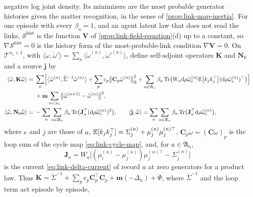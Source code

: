negative log joint density. Its minimizers are the most
probable generator histories given the matter recognition, in the sense of
\cref{prop:link-map-inertia}. For one episode with every $\beta_a=1$, and an agent latent law that
does not read the links, $\mathscr S^{\mathrm{hist}}$ is the function $\mathbf V$ of
\cref{prop:link-field-equation}(d) up to a constant, so $\nabla\mathscr S^{\mathrm{hist}}=0$ is the history
form of the most-probable-link condition $\nabla\mathbf V=0$. On $\mathscr T^{n_1+1}$, with
$\langle\mathring\omega,\mathring\omega'\rangle=\sum_n\langle\mathring\omega^{(n)},\mathring\omega'^{(n)}\rangle$,
define self-adjoint operators $\mathbf K$ and $\mathbf N_0$ and a source $\mathbf j$ by
\begin{equation}
\begin{aligned}
\langle\mathring\omega,\mathbf K\mathring\omega\rangle
={}&\sum_n\Bigl[\bigl\langle\mathring\omega^{(n)},\mathring\Sigma^{-1}\mathring\omega^{(n)}\bigr\rangle+\sum_p\mathrm c_p\bigl\lVert\mathbf C_p\mathring\omega^{(n)}\bigr\rVert_{\mathsf G}^2
+\sum_{a\in\mathfrak A_n}\beta_a\operatorname{Tr}\bigl(W_a\mathrm d\rho\mathring\omega^{(n)}_e\mathbb E\bigl[k_jk_j^\top\bigr](\mathrm d\rho\mathring\omega^{(n)}_e)^\top\bigr)\Bigr]\\
&+\mathbf m\sum_{n<n_1}\bigl\lVert\mathring\omega^{(n+1)}-\mathring\omega^{(n)}\bigr\rVert^2,\\
\langle\mathring\omega,\mathbf N_0\mathring\omega\rangle
={}&-\sum_n\sum_{a\in\mathfrak A_n}\beta_a\operatorname{Tr}\bigl(\mathbf J_a^\top(\mathrm d\rho\mathring\omega^{(n)}_e)^2\bigr),
\qquad
\langle\mathbf j,\mathring\omega\rangle=\sum_n\sum_{a\in\mathfrak A_n}\beta_a\operatorname{Tr}\bigl(\mathbf J_a^\top\mathrm d\rho\mathring\omega^{(n)}_e\bigr),
\end{aligned}
\label{eq:link-linear-operator}
\end{equation}
where $e$ and $j$ are those of $a$, $\mathbb E[k_jk_j^\top]=\Sigma^{(n)}_j+\mu^{(n)}_j\mu^{(n)\top}_j$,
$\mathbf C_p\mathring\omega=(\mathbf C\mathring\omega)_p$ is the loop sum of the cycle map
\eqref{eq:link-cycle-map}, and, for $a\in\mathfrak A_n$,
\begin{equation}
\mathbf J_a=W_a\bigl[(\mu^{(n)}_i-\mu^{(n)}_j)\mu^{(n)\top}_j-\Sigma^{(n)}_j\bigr]
\label{eq:link-zero-current}
\end{equation}
is the current \eqref{eq:link-delta-current} of record $a$ at zero generators for a product law. Thus
$\mathbf K=\mathring\Sigma^{-1}+\sum_p\mathrm c_p\mathbf C_p^\top\mathbf C_p+\mathbf m(-\Delta_n)+\mathring\Phi$,
where $\mathring\Sigma^{-1}$ and the loop term act episode by episode,
